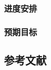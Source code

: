 \subsubsection{进度安排}


\subsubsection{预期目标}


\clearpage

\subsection{参考文献}
{\normalfont{}\setlength{\baselineskip}{14pt}
\renewcommand{\refname}{\vspace{-\baselineskip}}
}